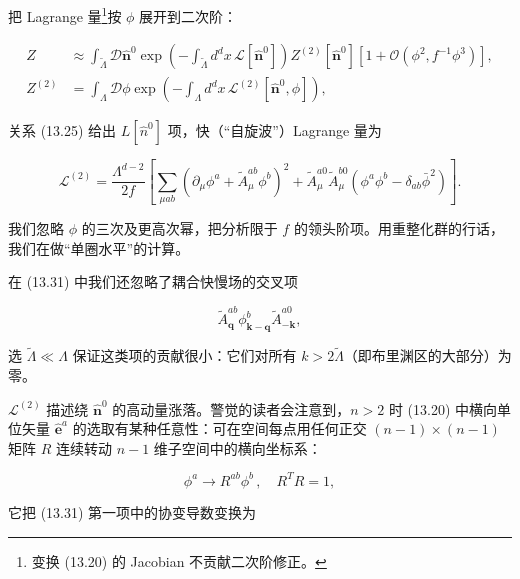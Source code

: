 把 Lagrange 量\footnote{变换 (13.20) 的 Jacobian 不贡献二次阶修正。}按 $\phi$ 展开到二次阶：

\begin{align*}
Z & \approx \int_{\tilde {\Lambda}} \mathcal {D} \hat {\mathbf {n}} ^ {0} \exp \left( - \int_{\tilde {\Lambda}} d ^ {d} x \, \mathcal {L} [ \hat {\mathbf {n}} ^ {0} ] \right) Z ^ {(2)} [ \hat {\mathbf {n}} ^ {0} ] \left[ 1 + \mathcal {O} ( \phi^ {2}, f ^ {- 1} \phi^ {3} ) \right] ,\\
Z ^ {(2)} & = \int_{\Lambda} \mathcal {D} \phi \exp \left( - \int_{\Lambda} d ^ {d} x \, \mathcal {L} ^ {(2)} \left[ \hat {\mathbf {n}} ^ {0}, \phi \right] \right) ,
\tag{13.30}
\end{align*}

关系 (13.25) 给出 $L[\hat{n}^{0}]$ 项，快（“自旋波”）Lagrange 量为

\begin{equation*}
\mathcal {L} ^ {(2)} = \frac {\Lambda^ {d - 2}}{2 f} \left[ \sum_{\mu ab} \left( \partial_ {\mu} \phi^ {a} + \tilde {A} _ {\mu} ^ {ab} \phi^ {b} \right) ^ {2} + \tilde {A} _ {\mu} ^ {a 0} \tilde {A} _ {\mu} ^ {b 0} \left( \phi^ {a} \phi^ {b} - \delta_ {ab} \bar {\phi} ^ {2} \right) \right].
\tag{13.31}
\end{equation*}

我们忽略 $\phi$ 的三次及更高次幂，把分析限于 $f$ 的领头阶项。用重整化群的行话，我们在做“单圈水平”的计算。

在 (13.31) 中我们还忽略了耦合快慢场的交叉项

\begin{equation*}
\tilde {A} _ {\mathbf {q}} ^ {ab} \phi_{\mathbf {k - q}} ^ {b} \tilde {A} _ {- \mathbf {k}} ^ {a 0} ,
\tag{13.32}
\end{equation*}

选 $\tilde{\Lambda} \ll \Lambda$ 保证这类项的贡献很小：它们对所有 $k > 2\tilde{\Lambda}$（即布里渊区的大部分）为零。

$\mathcal{L}^{(2)}$ 描述绕 $\hat{\mathbf{n}}^{0}$ 的高动量涨落。警觉的读者会注意到，$n > 2$ 时 (13.20) 中横向单位矢量 $\hat{\mathbf{e}}^{a}$ 的选取有某种任意性：可在空间每点用任何正交 $(n - 1) \times (n - 1)$ 矩阵 $R$ 连续转动 $n - 1$ 维子空间中的横向坐标系：

\begin{equation*}
\phi^ {a} \rightarrow R ^ {ab} \phi^ {b} \, , \quad R ^ {T} R = 1 ,
\tag{13.33}
\end{equation*}

它把 (13.31) 第一项中的协变导数变换为

